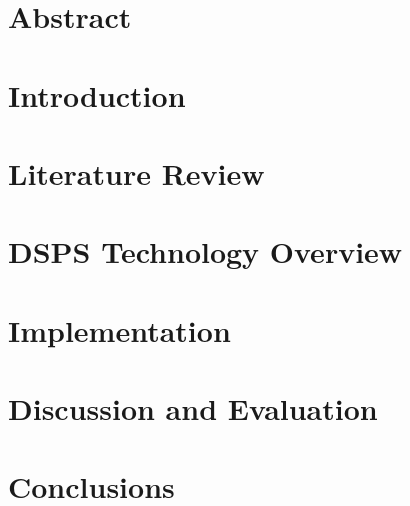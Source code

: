 \documentclass[a4paper,11pt]{article}
\begin{document}



\section{Abstract}
\label{sec:abstract}



\section{Introduction}
\label{sec:intro}



\section{Literature Review}
\label{sec:litrev}



\section{DSPS Technology Overview}
\label{sec:overview}



\section{Implementation}
\label{sec:implementation}



\section{Discussion and Evaluation}
\label{sec:evaluation}



\section{Conclusions}
\label{sec:conclusion}





\end{document}
